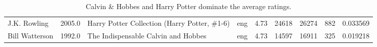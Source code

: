 \documentclass[11pt]{article}
\begin{document}
\begin{table}
\begin{tabular}{lHlHrHHHZ}
                               J.K. Rowling &                     2005.0 &       Harry Potter Collection (Harry Potter, \#1-6) &           eng &            4.73 &          24618 &               26274 &                      882 &       0.033569 \\
                             Bill Watterson &                     1992.0 &                The Indispensable Calvin and Hobbes &           eng &            4.73 &          14597 &               16911 &                      325 &       0.019218 \\
\bottomrule
\end{tabular}
    \caption[Most Highly-Rated Books]{Calvin \& Hobbes and Harry Potter dominate the average ratings.}
     \label{tbl:most-rated-books}
\end{table}


        
\end{document}
